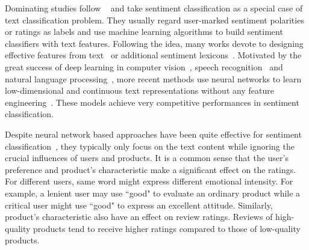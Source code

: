\documentclass[letterpaper]{article} \usepackage{aaai18}  \usepackage{times}  \usepackage{helvet}  \usepackage{courier}  \usepackage{url}  \usepackage{graphicx}  \frenchspacing  \usepackage{amsmath}
\begin{document}
Dominating studies follow ~\cite{pang2005seeing,pang2002thumbs} and take sentiment classification as a special case of text classification problem. They usually regard user-marked sentiment polarities or ratings as labels and use machine learning algorithms to build sentiment classifiers with text features. Following the idea, many works devote to designing effective features from text~\cite{pang2002thumbs,qu2010bag} or additional sentiment lexicons~\cite{ding2008holistic,taboada2011lexicon,kiritchenko2014sentiment}. Motivated by the great success of deep learning in computer vision~\cite{krizhevsky2012imagenet}, speech recognition~\cite{dahl2012context} and natural language processing~\cite{bengio2003neural}, more recent methods use neural networks to learn low-dimensional and continuous text representations without any feature engineering~\cite{glorot2011domain,socher2011semi,socher2012semantic,socher2013recursive,kim2014convolutional}. These models achieve very competitive performances in sentiment classification.

Despite neural network based approaches have been quite effective for sentiment classification~\cite{johnson2014effective,tang2015document}, they typically only focus on the text content while ignoring the crucial influences of users and products. It is a common sense that the user's preference and product's characteristic make a significant effect on the ratings. For different users, same word might express different emotional intensity. For example, a lenient user may use ``good" to evaluate an ordinary product while a critical user might use ``good" to express an excellent attitude. Similarly, product's characteristic also have an effect on review ratings. Reviews of high-quality products tend to receive higher ratings compared to those of low-quality products.
\end{document}
